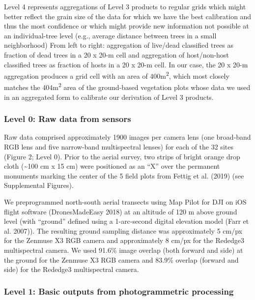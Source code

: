 \documentclass[]{article}
\begin{document}
Level 4 represents aggregations of Level 3 products to regular grids
which might better reflect the grain size of the data for which we have
the best calibration and thus the most confidence or which might provide
new information not possible at an individual-tree level (e.g., average
distance between trees in a small neighborhood) From left to right:
aggregation of live/dead classified trees as fraction of dead trees in a
20 x 20-m cell and aggregation of host/non-host classified trees as
fraction of hosts in a 20 x 20-m cell. In our case, the 20 x 20-m
aggregation produces a grid cell with an area of
400m\textsuperscript{2}, which most closely matches the
404m\textsuperscript{2} area of the ground-based vegetation plots whose
data we used in an aggregated form to calibrate our derivation of Level
3 products.

\hypertarget{level-0-raw-data-from-sensors}{%
\subsubsection{Level 0: Raw data from
sensors}\label{level-0-raw-data-from-sensors}}

Raw data comprised approximately 1900 images per camera lens (one
broad-band RGB lens and five narrow-band multispectral lenses) for each
of the 32 sites (Figure 2; Level 0). Prior to the aerial survey, two
strips of bright orange drop cloth (\textasciitilde{}100 cm x 15 cm)
were positioned as an ``X'' over the permanent monuments marking the
center of the 5 field plots from Fettig et al. (2019) (see Supplemental
Figures).

We preprogrammed north-south aerial transects using Map Pilot for DJI on
iOS flight software (DronesMadeEasy 2018) at an altitude of 120 m above
ground level (with ``ground'' defined using a 1-arc-second digital
elevation model (Farr et al. 2007)). The resulting ground sampling
distance was approximately 5 cm/px for the Zenmuse X3 RGB camera and
approximately 8 cm/px for the Rededge3 multispectral camera. We used
91.6\% image overlap (both forward and side) at the ground for the
Zenmuse X3 RGB camera and 83.9\% overlap (forward and side) for the
Rededge3 multispectral camera.

\hypertarget{level-1-basic-outputs-from-photogrammetric-processing}{%
\subsubsection{Level 1: Basic outputs from photogrammetric
processing}\label{level-1-basic-outputs-from-photogrammetric-processing}}
\end{document}
